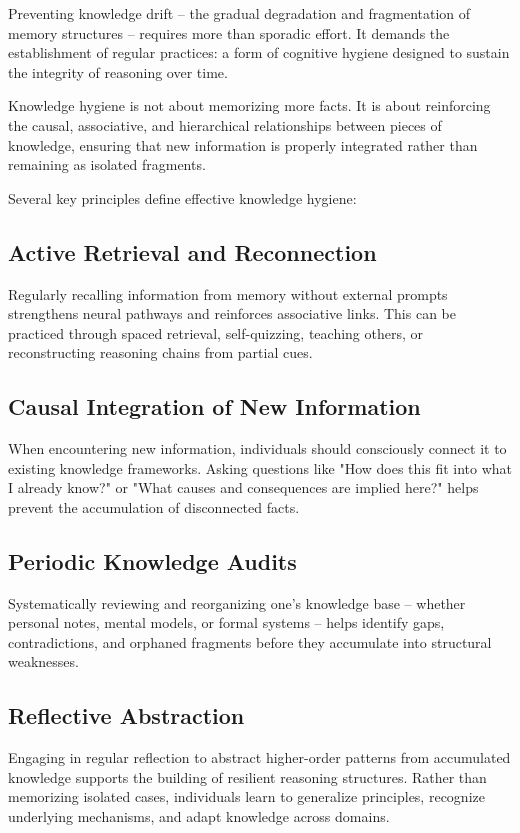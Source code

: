 Preventing knowledge drift -- the gradual degradation and fragmentation
of memory structures -- requires more than sporadic effort. It demands
the establishment of regular practices: a form of cognitive hygiene
designed to sustain the integrity of reasoning over time.

Knowledge hygiene is not about memorizing more facts. It is about
reinforcing the causal, associative, and hierarchical relationships
between pieces of knowledge, ensuring that new information is properly
integrated rather than remaining as isolated fragments.

Several key principles define effective knowledge hygiene:

\subsection{Active Retrieval and Reconnection}

Regularly recalling information from memory without external prompts
strengthens neural pathways and reinforces associative links. This can
be practiced through spaced retrieval, self-quizzing, teaching others,
or reconstructing reasoning chains from partial cues.

\subsection{Causal Integration of New Information}

When encountering new information, individuals should consciously
connect it to existing knowledge frameworks. Asking questions like "How
does this fit into what I already know?" or "What causes and
consequences are implied here?" helps prevent the accumulation of
disconnected facts.

\subsection{Periodic Knowledge Audits}

Systematically reviewing and reorganizing one's knowledge base -- whether
personal notes, mental models, or formal systems -- helps identify gaps,
contradictions, and orphaned fragments before they accumulate into
structural weaknesses.

\subsection{Reflective Abstraction}

Engaging in regular reflection to abstract higher-order patterns from
accumulated knowledge supports the building of resilient reasoning
structures. Rather than memorizing isolated cases, individuals learn to
generalize principles, recognize underlying mechanisms, and adapt
knowledge across domains.


